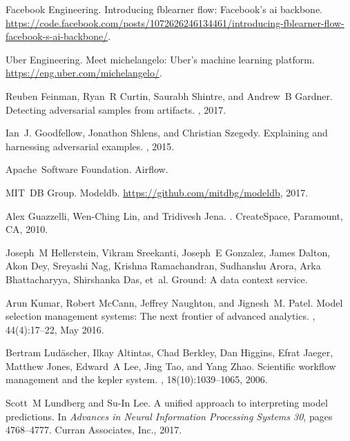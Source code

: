 \documentclass[11pt]{article}
\begin{document}
\begin{thebibliography}{10}
\begin{small}
Facebook Engineering.
\newblock Introducing fblearner flow: Facebook's ai backbone.
\newblock
  \url{https://code.facebook.com/posts/1072626246134461/introducing-fblearner-flow-facebook-s-ai-backbone/}.

Uber Engineering.
\newblock Meet michelangelo: Uber's machine learning platform.
\newblock \url{https://eng.uber.com/michelangelo/}.

Reuben Feinman, Ryan~R Curtin, Saurabh Shintre, and Andrew~B Gardner.
\newblock Detecting adversarial samples from artifacts.
, 2017.

Ian~J. Goodfellow, Jonathon Shlens, and Christian Szegedy.
\newblock Explaining and harnessing adversarial examples.
, 2015.

Apache~Software Foundation.
\newblock Airflow.

MIT~DB Group.
\newblock Modeldb.
\newblock \url{https://github.com/mitdbg/modeldb}, 2017.

Alex Guazzelli, Wen-Ching Lin, and Tridivesh Jena.
.
\newblock CreateSpace, Paramount, CA, 2010.

Joseph~M Hellerstein, Vikram Sreekanti, Joseph~E Gonzalez, James Dalton, Akon
  Dey, Sreyashi Nag, Krishna Ramachandran, Sudhanshu Arora, Arka Bhattacharyya,
  Shirshanka Das, et~al.
\newblock Ground: A data context service.

Arun Kumar, Robert McCann, Jeffrey Naughton, and Jignesh~M. Patel.
\newblock Model selection management systems: The next frontier of advanced
  analytics.
, 44(4):17--22, May 2016.

Bertram Lud{\"a}scher, Ilkay Altintas, Chad Berkley, Dan Higgins, Efrat Jaeger,
  Matthew Jones, Edward~A Lee, Jing Tao, and Yang Zhao.
\newblock Scientific workflow management and the kepler system.
,
  18(10):1039--1065, 2006.

Scott~M Lundberg and Su-In Lee.
\newblock A unified approach to interpreting model predictions.
\newblock In {\em Advances in Neural Information Processing Systems 30}, pages
  4768--4777. Curran Associates, Inc., 2017.


\end{small}
\end{thebibliography}
\end{document}
